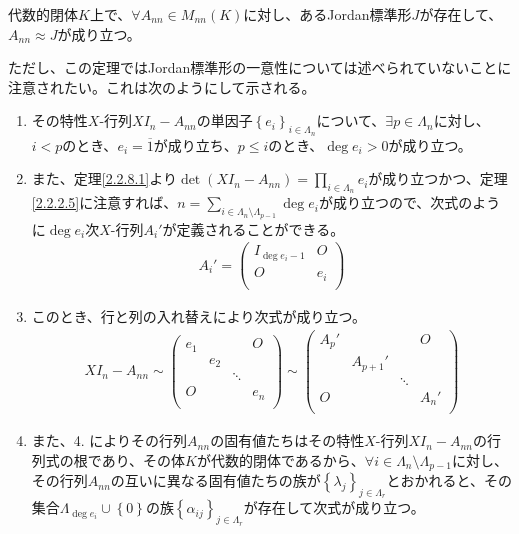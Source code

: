 \documentclass[dvipdfmx]{jsarticle}
\begin{document}
\begin{thm}\label{2.2.8.15}
代数的閉体$K$上で、$\forall A_{nn} \in M_{nn}(K)$に対し、あるJordan標準形$J$が存在して、$A_{nn} \approx J$が成り立つ。
\end{thm}\par
ただし、この定理ではJordan標準形の一意性については述べられていないことに注意されたい。これは次のようにして示される。
\begin{enumerate}
\item
  その特性$X$-行列$XI_{n} - A_{nn}$の単因子$\left\{ e_{i} \right\}_{i \in \varLambda_{n}}$について、$\exists p \in \varLambda_{n}$に対し、$i < p$のとき、$e_{i} = \overline{1}$が成り立ち、$p \leq i$のとき、$\deg e_{i} > 0$が成り立つ。
\item
  また、定理\ref{2.2.8.1}より$\det\left( XI_{n} - A_{nn} \right) = \prod_{i \in \varLambda_{n}} e_{i}$が成り立つかつ、定理\ref{2.2.2.5}に注意すれば、$n = \sum_{i \in \varLambda_{n} \setminus \varLambda_{p - 1}} {\deg e_{i}}$が成り立つので、次式のように$\deg e_{i}$次$X$-行列$A_{i}'$が定義されることができる。
\begin{align*}
A_{i}' = \begin{pmatrix}
I_{\deg e_{i} - 1} & O \\
O & e_{i} \\
\end{pmatrix}
\end{align*}
\item
  このとき、行と列の入れ替えにより次式が成り立つ。
\begin{align*}
XI_{n} - A_{nn} \sim \begin{pmatrix}
e_{1} & \  & \  & O \\
\  & e_{2} & \  & \  \\
\  & \  & \ddots & \  \\
O & \  & \  & e_{n} \\
\end{pmatrix} \sim \begin{pmatrix}
A_{p}' & \  & \  & O \\
\  & A_{p + 1}' & \  & \  \\
\  & \  & \ddots & \  \\
O & \  & \  & A_{n}' \\
\end{pmatrix}
\end{align*}
\item
  また、4. によりその行列$A_{nn}$の固有値たちはその特性$X$-行列$XI_{n} - A_{nn}$の行列式の根であり、その体$K$が代数的閉体であるから、$\forall i \in \varLambda_{n} \setminus \varLambda_{p - 1}$に対し、その行列$A_{nn}$の互いに異なる固有値たちの族が$\left\{ \lambda_{j} \right\}_{j \in \varLambda_{r}}$とおかれると、その集合$\varLambda_{\deg e_{i}} \cup \left\{ 0 \right\}$の族$\left\{ \alpha_{ij} \right\}_{j \in \varLambda_{r}}$が存在して次式が成り立つ。

\end{enumerate}
\end{document}
